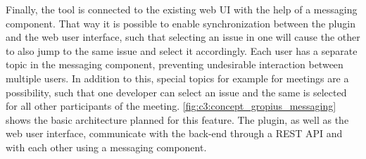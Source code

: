 Finally, the tool is connected to the existing web \gls{UI} with the help of a messaging component.
That way it is possible to enable synchronization between the plugin and the web user interface, 
such that selecting an issue in one will cause the other to also jump to the same issue and select it accordingly. 
Each user has a separate topic in the messaging component, preventing undesirable interaction between multiple users. 
In addition to this, special topics for example for meetings are a possibility, 
such that one developer can select an issue and the same is selected for all other participants of the meeting. 
\cref{fig:c3:concept_gropius_messaging} shows the basic architecture planned for this feature. 
The plugin, as well as the web user interface, communicate with the back-end through a \gls{REST} \gls{API} and with each other using a messaging component.
